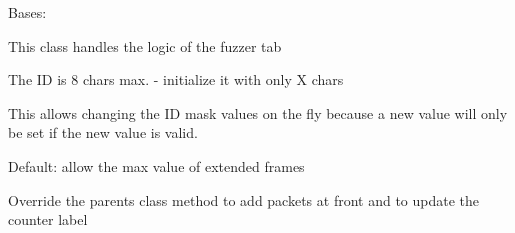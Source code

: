 \documentclass[letterpaper,10pt,english]{sphinxmanual}
\begin{document}
\begin{fulllineitems}
\label{\detokenize{src:src.FuzzerTab.FuzzerTab}}
Bases: {\hyperref[\detokenize{src:src.AbstractTab.AbstractTab}]{}}

This class handles the logic of the fuzzer tab

\begin{fulllineitems}
\label{\detokenize{src:src.FuzzerTab.FuzzerTab.IDMask}}
The ID is 8 chars max. - initialize it with only X chars

\end{fulllineitems}


\begin{fulllineitems}
\label{\detokenize{src:src.FuzzerTab.FuzzerTab.IDMaskChanged}}
This allows changing the ID mask values on the fly because a new value
will only be set if the new value is valid.

\end{fulllineitems}


\begin{fulllineitems}
\label{\detokenize{src:src.FuzzerTab.FuzzerTab.IDMaxValue}}
Default: allow the max value of extended frames

\end{fulllineitems}


\begin{fulllineitems}
\label{\detokenize{src:src.FuzzerTab.FuzzerTab.__init__}}
\end{fulllineitems}


\begin{fulllineitems}
\label{\detokenize{src:src.FuzzerTab.FuzzerTab.addPacket}}
Override the parents class method to add packets at front and to update the counter label


\end{fulllineitems}
\end{fulllineitems}
\end{document}

